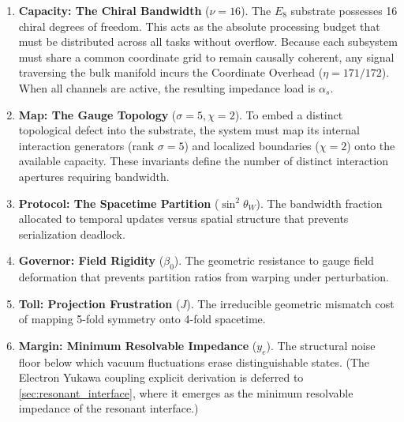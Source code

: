 \begin{enumerate}
    \item \textbf{Capacity: The Chiral Bandwidth} ($\nu = 16$). The $E_8$ substrate possesses 16 chiral degrees of freedom. This acts as the absolute processing budget that must be distributed across all tasks without overflow. Because each subsystem must share a common coordinate grid to remain causally coherent, any signal traversing the bulk manifold incurs the Coordinate Overhead ($\eta = 171/172$). When all channels are active, the resulting impedance load is $\alpha_s$.

    \item \textbf{Map: The Gauge Topology} ($\sigma = 5, \chi = 2$). To embed a distinct topological defect into the substrate, the system must map its internal interaction generators (rank $\sigma = 5$) and localized boundaries ($\chi = 2$) onto the available capacity. These invariants define the number of distinct interaction apertures requiring bandwidth.
    
    \item \textbf{Protocol: The Spacetime Partition} ($\sin^2\theta_W$). The bandwidth fraction allocated to temporal updates versus spatial structure that prevents serialization deadlock.

    \item \textbf{Governor: Field Rigidity} ($\beta_0$). The geometric resistance to gauge field deformation that prevents partition ratios from warping under perturbation.
    
    \item \textbf{Toll: Projection Frustration} ($J$). The irreducible geometric mismatch cost of mapping 5-fold symmetry onto 4-fold spacetime.
    
    \item \textbf{Margin: Minimum Resolvable Impedance} ($y_e$). The structural noise floor below which vacuum fluctuations erase distinguishable states. (The Electron Yukawa coupling explicit derivation is deferred to \cref{sec:resonant_interface}, where it emerges as the minimum resolvable impedance of the resonant interface.)
\end{enumerate}